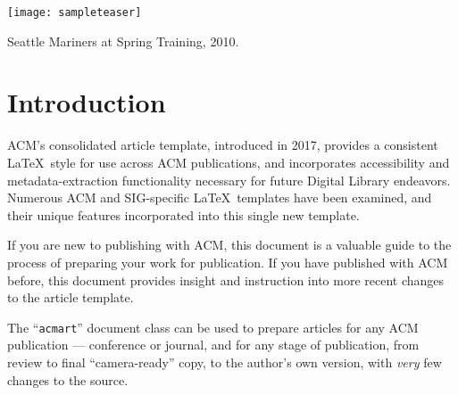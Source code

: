 \documentclass[sigconf, authordraft]{acmart}
\begin{document}
	 
	 


	\begin{teaserfigure}
		\texttt{[image: sampleteaser]}
		\caption{Seattle Mariners at Spring Training, 2010.}
		\label{fig:teaser}
	\end{teaserfigure}

	  

	\maketitle


	\section{Introduction}
	ACM's consolidated article template, introduced in 2017, provides a consistent
	\LaTeX\ style for use across ACM publications, and incorporates accessibility
	and metadata-extraction functionality necessary for future Digital Library
	endeavors. Numerous ACM and SIG-specific \LaTeX\ templates have been examined,
	and their unique features incorporated into this single new template.

	If you are new to publishing with ACM, this document is a valuable guide to the
	process of preparing your work for publication. If you have published with ACM
	before, this document provides insight and instruction into more recent changes
	to the article template.

	The ``\verb|acmart|'' document class can be used to prepare articles for any ACM
	publication --- conference or journal, and for any stage of publication, from review
	to final ``camera-ready'' copy, to the author's own version, with {\itshape very}
	few changes to the source.
\end{document}
